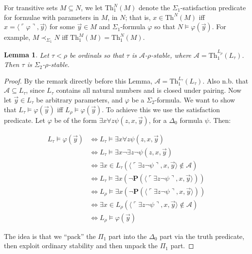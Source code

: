 \documentclass{article}
\theoremstyle{definition}
\theoremstyle{plain}
\theoremstyle{plain}
\theoremstyle{plain}
\theoremstyle{plain}
\theoremstyle{remark}
\theoremstyle{remark}
\theoremstyle{remark}
\theoremstyle{plain}
\newtheorem{lemma}[definition]{Lemma}
\theoremstyle{plain}
\theoremstyle{plain}
\begin{document}
For transitive sets $M \subseteq N$, we let $\mathrm{Th}_1^N(M)$ denote the $\Sigma_1$-satisfaction predicate for formulae with parameters in $M$, in $N$; that is, $x \in \mathrm{Th}^N(M)$ iff $x = \langle \ulcorner \varphi \urcorner, \vec{y} \rangle$ for some $\vec{y} \in M$ and $\Sigma_1$-formula $\varphi$ so that $N \models \varphi(\vec{y})$. For example, $M \prec_{\Sigma_1} N$ iff $\mathrm{Th}_1^M(M) = \mathrm{Th}_1^N(M)$.

\begin{lemma}
\label{TruthPredicate}
Let $\tau < \rho$ be ordinals so that $\tau$ is $\mathcal{A}$-$\rho$-stable, where $\mathcal{A} = \mathrm{Th}_1^{L_\rho}(L_\tau)$. Then $\tau$ is $\Sigma_2$-$\rho$-stable.
\end{lemma}

\begin{proof}
By the remark directly before this Lemma, $\mathcal{A} = \mathrm{Th}_1^{L_\tau}(L_\tau)$. Also n.b. that $\mathcal{A} \subseteq L_\tau$, since $L_\tau$ contains all natural numbers and is closed under pairing. Now let $\vec{y} \in L_\tau$ be arbitrary parameters, and $\varphi$ be a $\Sigma_2$-formula. We want to show that $L_\tau \models \varphi(\vec{y})$ iff $L_\rho \models \varphi(\vec{y})$. To achieve this we use the satisfaction predicate. Let $\varphi$ be of the form $\exists x \forall z \psi(z, x, \vec{y})$, for a $\Delta_0$ formula $\psi$. Then:

\begin{equation}
\begin{split}
L_\tau \models \varphi(\vec{y}) & \iff L_\tau \models \exists x \forall z \psi(z, x, \vec{y}) \\ & \iff L_\tau \models \exists x \neg \exists z \neg \psi(z, x, \vec{y}) \\ & \iff \exists x \in L_\tau (\langle \ulcorner \exists z \neg \psi \urcorner, x, \vec{y} \rangle \notin \mathcal{A}) \\ & \iff L_\tau \models \exists x (\neg \mathbf{P}(\langle \ulcorner \exists z \neg \psi \urcorner, x, \vec{y} \rangle)) \\ & \iff L_\rho \models \exists x (\neg \mathbf{P}(\langle \ulcorner \exists z \neg \psi \urcorner, x, \vec{y} \rangle)) \\ & \iff \exists x \in L_\rho (\langle \ulcorner \exists z \neg \psi \urcorner, x, \vec{y} \rangle \notin \mathcal{A}) \\ & \iff L_\rho \models \varphi(\vec{y})
\end{split}
\end{equation}

The idea is that we ``pack'' the $\Pi_1$ part into the $\Delta_0$ part via the truth predicate, then exploit ordinary stability and then unpack the $\Pi_1$ part.
\end{proof}
\end{document}
